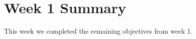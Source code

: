 \documentclass{article}
\begin{document}
\section*{Week 1 Summary}

\vspace{0.5cm}

This week we completed the remaining objectives from week 1.
\end{document}
